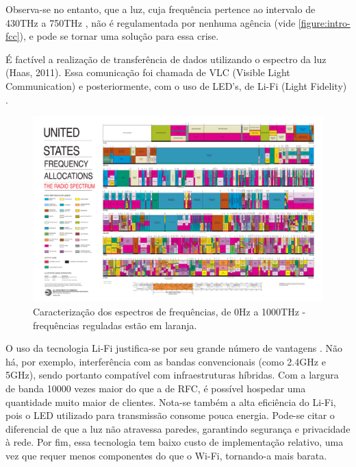 	Observa-se no entanto, que a luz, cuja frequência pertence ao intervalo de 430THz a 750THz \cite{vision},  não é regulamentada por nenhuma agência (vide \autoref{figure:intro-fcc}), e pode se tornar uma solução para essa crise.

	 É factível a realização de transferência de dados utilizando o espectro da luz (Haas, 2011). Essa comunicação foi chamada de VLC (Visible Light Communication) e posteriormente, com o uso de LED's, de Li-Fi (Light Fidelity) \cite{what-is-lifi}. \par

	\begin{figure}[h!]
	 	\caption{\label{figure:intro-fcc}Caracterização dos espectros de frequências, de 0Hz a 1000THz - frequências reguladas estão em laranja.}
		\centering
 		\includegraphics[width=\textwidth, trim={36.5cm 3.1cm 40cm 61cm},clip]{2003-allochrt.pdf}
	\end{figure}

	O uso da tecnologia Li-Fi justifica-se por seu grande número de vantagens \cite{comparison-wifi}. Não há, por exemplo, interferência com as bandas convencionais (como 2.4GHz e 5GHz), sendo portanto compatível com infraestruturas híbridas. Com a largura de banda 10000 vezes maior do que a de RFC, é possível hospedar uma quantidade muito maior de clientes. Nota-se também a alta eficiência do Li-Fi, pois o LED utilizado para transmissão consome pouca energia. Pode-se citar o diferencial de que a luz não atravessa paredes, garantindo segurança e privacidade à rede. Por fim, essa tecnologia tem baixo custo de implementação relativo, uma vez que requer menos componentes do que o Wi-Fi, tornando-a mais barata. \par

